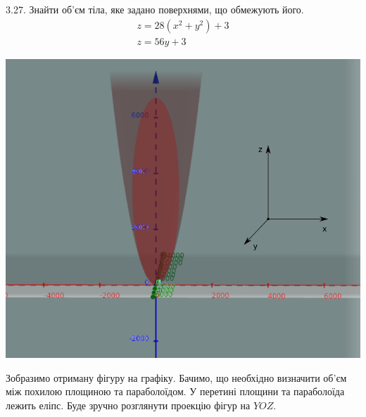 \documentclass[14pt,a4paper]{scrartcl}
\theoremstyle{definition}
\theoremstyle{remark}
\theoremstyle{definition}
\theoremstyle{definition}
\begin{document}
3.27. Знайти об'єм тіла, яке задано поверхнями, що обмежують його.
$$
\begin{gathered}
z = 28(x^2+ y^2)+ 3\\
z = 56y + 3
\end{gathered}
$$
\begin{center} \includegraphics[scale=0.5]{4.png} \end{center}
Зобразимо отриману фігуру на графіку. Бачимо, що необхідно визначити об'єм між похилою площиною та параболоїдом. У перетині площини та параболоїда лежить еліпс. Буде зручно розглянути проекцію фігур на $YOZ$.
\end{document}
